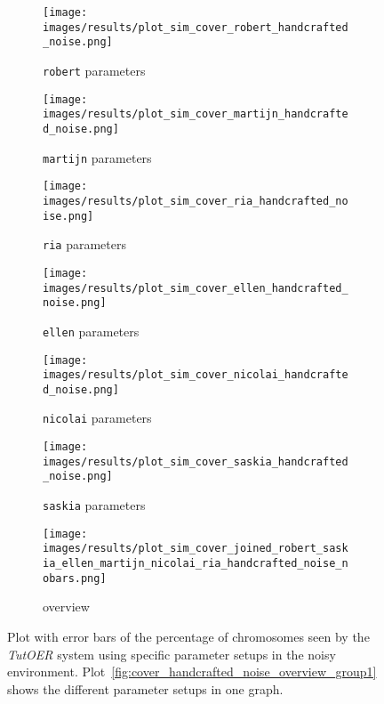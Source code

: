 \begin{figure}[ht]
	\begin{subfigure}{0.48\linewidth}
	\texttt{[image: images/results/plot\_sim\_cover\_robert\_handcrafted\_noise.png]}
	\caption{\texttt{robert} parameters}
	\label{fig:cover_handcrafted_noise_robert}
	\end{subfigure}
	\hfill
	\begin{subfigure}{0.48\linewidth}
	\texttt{[image: images/results/plot\_sim\_cover\_martijn\_handcrafted\_noise.png]}
	\caption{\texttt{martijn} parameters}
	\label{fig:cover_handcrafted_noise_martijn}
	\end{subfigure}
	\begin{subfigure}{0.48\linewidth}
	\texttt{[image: images/results/plot\_sim\_cover\_ria\_handcrafted\_noise.png]}
	\caption{\texttt{ria} parameters}
	\label{fig:cover_handcrafted_noise_ria}
	\end{subfigure}
	\hfill
	\begin{subfigure}{0.48\linewidth}
	\texttt{[image: images/results/plot\_sim\_cover\_ellen\_handcrafted\_noise.png]}
	\caption{\texttt{ellen} parameters}
	\label{fig:cover_handcrafted_noise_ellen}
	\end{subfigure}
	\begin{subfigure}{0.48\linewidth}
	\texttt{[image: images/results/plot\_sim\_cover\_nicolai\_handcrafted\_noise.png]}
	\caption{\texttt{nicolai} parameters}
	\label{fig:cover_handcrafted_noise_nicolai}
	\end{subfigure}
	\hfill
	\begin{subfigure}{0.48\linewidth}
	\texttt{[image: images/results/plot\_sim\_cover\_saskia\_handcrafted\_noise.png]}
	\caption{\texttt{saskia} parameters}
	\label{fig:cover_handcrafted_noise_saskia}
	\end{subfigure}
	\begin{subfigure}{\linewidth}
	\texttt{[image: images/results/plot\_sim\_cover\_joined\_robert\_saskia\_ellen\_martijn\_nicolai\_ria\_handcrafted\_noise\_nobars.png]}
	\caption{overview}
	\label{fig:cover_handcrafted_noise_overview_group2}
	\end{subfigure}
	\caption{Plot with error bars of the percentage of chromosomes seen by the \emph{TutOER}
	system using specific parameter setups in the noisy environment.
	Plot~\ref{fig:cover_handcrafted_noise_overview_group1} shows the
	different parameter setups in one graph.}
	\label{fig:cover_handcrafted_noise_container_group2}
\end{figure}
